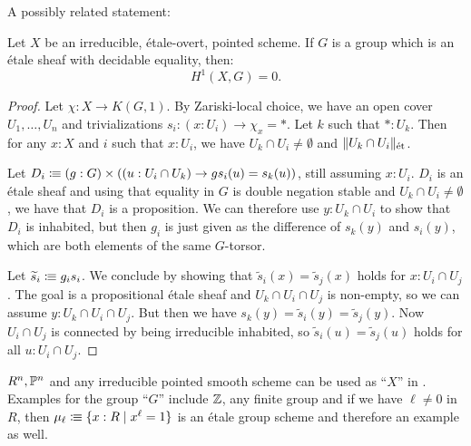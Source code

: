 A possibly related statement:

\begin{proposition}
  \label{cohom-discrete-coeff}
  Let $X$ be an irreducible, étale-overt, pointed scheme.
  If $G$ is a group which is an étale sheaf with decidable equality, then:
  \[
    H^1(X,G)=0.
  \]
\end{proposition}

\begin{proof}
  Let $\chi:X\to K(G,1)$.
  By Zariski-local choice, we have an open cover $U_1,\dots,U_n$ and
  trivializations $s_i:(x:U_i)\to \chi_x=\ast$.
  Let $k$ such that $\ast:U_k$.
  Then for any $x:X$ and $i$ such that $x:U_i$,
  we have \(U_k\cap U_i\neq \emptyset\) and $\|U_k\cap U_i\|_\et$.
  
  Let \(D_i\colonequiv (g:G)\times ((u:U_i\cap U_k)\to gs_i(u)=s_k(u))\), still assuming \(x:U_i\).
  \(D_i\) is an étale sheaf and using that equality in \(G\) is double negation stable and
  \(U_k\cap U_i\neq \emptyset\), we have that \(D_i\) is a proposition.
  We can therefore use \(y:U_k\cap U_i\) to show that \(D_i\) is inhabited,
  but then \(g_i\) is just given as the difference of \(s_k(y)\) and \(s_i(y)\),
  which are both elements of the same \(G\)-torsor.

  Let \(\widetilde{s}_i\colonequiv g_is_i\).
  We conclude by showing that \(\widetilde{s}_i(x)=\widetilde{s}_j(x)\) holds for \(x:U_i\cap U_j\).
  The goal is a propositional étale sheaf and \(U_k\cap U_i\cap U_j\) is non-empty,
  so we can assume \(y:U_k\cap U_i\cap U_j\).
  But then we have \(s_k(y)=\widetilde{s}_i(y)=\widetilde{s}_j(y)\).
  Now \(U_i\cap U_j\) is connected by being irreducible inhabited, so \(\widetilde{s}_i(u)=\widetilde{s}_j(u)\) holds for all \(u:U_i\cap U_j\).
\end{proof}

\begin{example}
  \(R^n,\bP^n\) and any irreducible pointed smooth scheme can be used as ``\(X\)'' in . Examples for the group ``\(G\)'' include \(\Z\), any finite group and if we have \(\ell\neq 0\) in \(R\), then \(\mu_\ell\colonequiv \{x:R\mid x^\ell=1\}\) is an étale group scheme and therefore an example as well.
\end{example}
